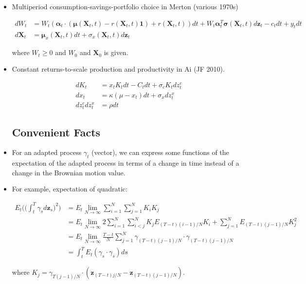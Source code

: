 \documentclass{article}
\newcommand{\onevec}{\mathbf{1}}
\newcommand{\Xvec}{\mathbf{X}}
\newcommand{\zvec}{\mathbf{z}}
\newcommand{\muvec}{\boldsymbol{\mu}}
\newcommand{\alphavec}{\boldsymbol{\alpha}}
\newcommand{\sigmamat}{\boldsymbol{\sigma}}
\begin{document}
\begin{itemize}
\item Multiperiod consumption-savings-portfolio choice in Merton (various 1970s)

\begin{align*}
dW_t &= W_t (\alphavec_t \cdot (\muvec(\Xvec_t, t) - r(\Xvec_t, t)\onevec) + r(\Xvec_t, t)) dt +W_t \alphavec_t^T \sigmamat(\Xvec_t, t)d\zvec_t - c_t dt + y_tdt \\
d \Xvec_t &= \muvec_x (\Xvec_t, t) dt + \sigma_x (\Xvec_t, t) d\zvec_t
\end{align*}

where $W_t \ge 0$ and $W_0$ and $\Xvec_0$ is given.

\item Constant returns-to-scale production and productivity in Ai (JF 2010).

\begin{align*}
dK_t &= x_t K_t dt - C_t dt + \sigma_c K_t dz_t^c \\
dx_t &= \kappa (\mu - x_t) dt + \sigma_x dz_t^x\\
dz_t^c dz_t^x &= \rho dt
\end{align*}

\subsection*{Convenient Facts}

\item For an adapted process $\gamma_t$ (vector), we can express some functions of the expectation of the adapted process in terms of a change in time instead of a change in the Brownian motion value.

\item For example, expectation of quadratic:

\begin{align}
E_t \Bigg( \Bigg( \int_t^T \gamma_s d\zvec_s \Bigg)^2 \Bigg) \nonumber
&= E_t \lim_{N \to \infty} \sum_{i=1}^N \sum_{j=1}^N K_i K_j \nonumber\\
&= E_t \lim_{N \to \infty} 2\sum_{i=1}^N \sum_{i<j}^N K_j E_{(T-t)(i-1)/N} K_i + \sum_{j=1}^N E_{(T-t)(j-1)/N} K_j^2 \nonumber\\
&= E_t \lim_{N \to \infty} \frac{T - t}{N} \sum_{j=1}^N \gamma_{(T-t)(j-1)/N} \cdot \gamma_{(T-t)(j-1)/N} \nonumber\\
&= \int_t^T E_t (\gamma_s \cdot \gamma_s) ds \label{cfq}
\end{align}

where $K_j = \gamma_{T(j-1)/N} \cdot (\zvec_{(T-t)j/N} - \zvec_{(T-t)(j-1)/N})$.


\end{itemize}
\end{document}
